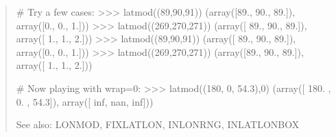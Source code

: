 \documentclass[letterpaper,10pt,english]{sphinxmanual}
\begin{document}
\begin{fulllineitems}
\begin{quote}
\begin{description}
\# Try a few cases:
\textgreater{}\textgreater{}\textgreater{} latmod((\sphinxhyphen{}89,\sphinxhyphen{}90,\sphinxhyphen{}91))
(array({[}\sphinxhyphen{}89., \sphinxhyphen{}90., \sphinxhyphen{}89.{]}), array({[}\sphinxhyphen{}0.,  0.,  1.{]}))
\textgreater{}\textgreater{}\textgreater{} latmod((\sphinxhyphen{}269,\sphinxhyphen{}270,\sphinxhyphen{}271))
(array({[} 89.,  90.,  89.{]}), array({[} 1.,  1.,  2.{]}))
\textgreater{}\textgreater{}\textgreater{} latmod((89,90,91))
(array({[} 89.,  90.,  89.{]}), array({[}\sphinxhyphen{}0.,  0.,  1.{]}))
\textgreater{}\textgreater{}\textgreater{} latmod((269,270,271))
(array({[}\sphinxhyphen{}89., \sphinxhyphen{}90., \sphinxhyphen{}89.{]}), array({[} 1.,  1.,  2.{]}))

\# Now playing with wrap=0:
\textgreater{}\textgreater{}\textgreater{} latmod((180, 0, 54.3),0)
(array({[} 180. ,    0. ,   54.3{]}), array({[} inf,  nan,  inf{]}))

\end{description}

See also: LONMOD, FIXLATLON, INLONRNG, INLATLONBOX
\end{quote}

\end{fulllineitems}

\end{document}
